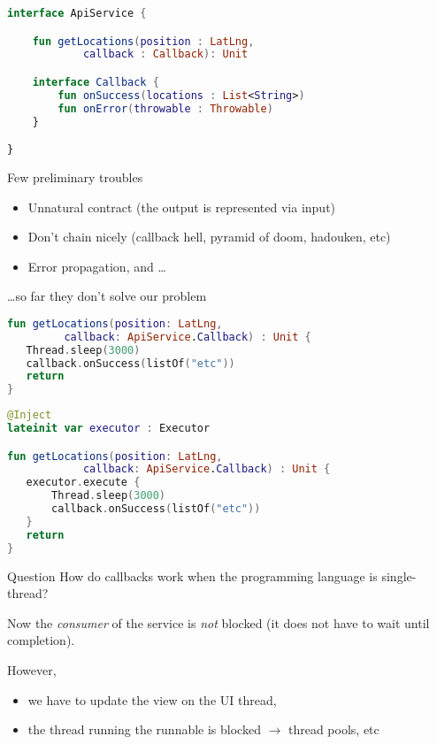 \documentclass[10pt]{beamer}
\begin{document}
\begin{frame}[fragile]
\begin{lstlisting}[language=Kotlin, basicstyle=\ttfamily]
interface ApiService {

    fun getLocations(position : LatLng,
            callback : Callback): Unit

    interface Callback {
        fun onSuccess(locations : List<String>)
        fun onError(throwable : Throwable)
    }

}
\end{lstlisting}
\end{frame}
\begin{frame}[fragile]
	Few preliminary troubles 
	\begin{itemize}
		\item Unnatural contract (the output is represented via input)
		\item Don't chain nicely (callback hell, pyramid of doom, hadouken, etc) 
		\item Error propagation, and \ldots  
	\end{itemize}

\end{frame}
\begin{frame}[fragile]
	\ldots so far they don't solve our problem 
\begin{lstlisting}[language=Kotlin, basicstyle=\ttfamily]
fun getLocations(position: LatLng, 
         callback: ApiService.Callback) : Unit {
   Thread.sleep(3000)
   callback.onSuccess(listOf("etc"))
   return
}
\end{lstlisting}
\end{frame}
\begin{frame}[fragile]
\begin{lstlisting}[language=Kotlin, basicstyle=\ttfamily]
@Inject 
lateinit var executor : Executor 

fun getLocations(position: LatLng, 
            callback: ApiService.Callback) : Unit {
   executor.execute {
       Thread.sleep(3000)
       callback.onSuccess(listOf("etc"))
   }
   return
}
\end{lstlisting}
\end{frame}
\begin{frame}[fragile]
	\begin{alertblock}{Question}
		How do callbacks work when the programming language is single-thread?
	\end{alertblock}
\end{frame}
\begin{frame}[fragile]
	Now the \emph{consumer} of the service is \emph{not} blocked (it does not have to wait until completion).

	However, 
	\begin{itemize}
		\item we have to update the view on the UI thread, 
		\item the thread running the runnable is blocked  $\rightarrow$ thread pools, etc
	\end{itemize}

\end{frame}
\end{document}
